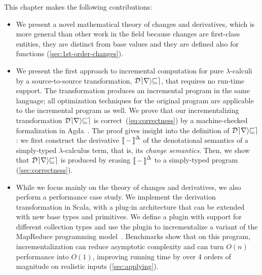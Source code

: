 This chapter makes the following contributions:
\begin{itemize}
\item We present a novel mathematical theory of changes and derivatives, which is more
  general than other work in the field because changes are
  first-class entities, they are distinct from base values and
  they are defined also for functions (\cref{sec:1st-order-changes}).
%
\item We present the first approach to incremental computation for
pure $\lambda$-calculi by a source-to-source transformation, $\mathcal{Derive}$, that requires no run-time
support. The transformation produces an incremental program in the same language;
all optimization techniques for the original program are
applicable to the incremental program as well.
%
%
We prove that our incrementalizing transformation $\mathcal{Derive}$
is correct~(\cref{eq:correctness})
by a machine-checked formalization in Agda~\citep{agda-head}.
The proof gives insight into the definition of $\mathcal{Derive}$: we
first construct the derivative $\EvalInc{-}$ of the denotational
semantics of a simply-typed $\lambda$-calculus term, that is, its
\emph{change semantics}.
%
Then, we show that $\mathcal{Derive}$ is produced by erasing
$\EvalInc{-}$ to a simply-typed program (\cref{sec:correctness}).

\item While we focus mainly on the theory of changes
and derivatives, we also perform a performance case study.
We implement the derivation transformation in Scala,
with a plug-in architecture that can be extended with new base
types and primitives. We define a plugin with support for
different collection types and use the plugin to 
incrementalize a variant of the MapReduce programming model~\citep{Lammel07}.
  Benchmarks show that on this program,
  incrementalization can reduce asymptotic complexity and can turn $O(n)$
  performance into $O(1)$, improving running time by over 4
  orders of magnitude on realistic inputs (\cref{sec:applying}).

\end{itemize}

